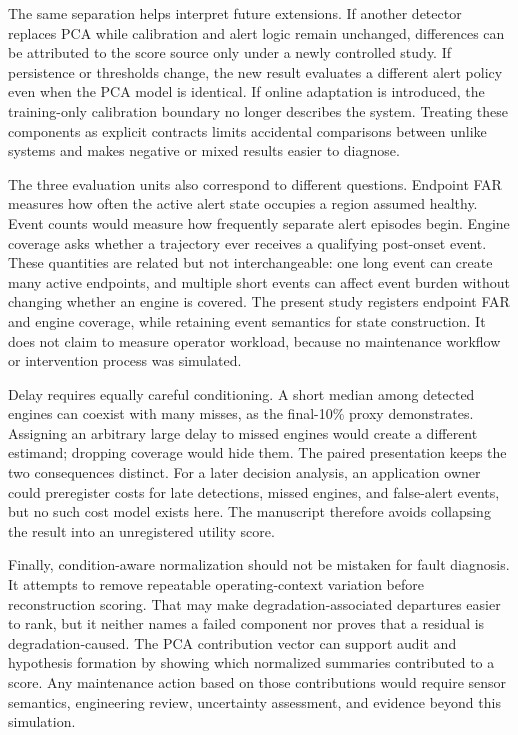 \documentclass[11pt]{article}
\begin{document}
The same separation helps interpret future extensions. If another detector replaces PCA while calibration and alert logic remain unchanged, differences can be attributed to the score source only under a newly controlled study. If persistence or thresholds change, the new result evaluates a different alert policy even when the PCA model is identical. If online adaptation is introduced, the training-only calibration boundary no longer describes the system. Treating these components as explicit contracts limits accidental comparisons between unlike systems and makes negative or mixed results easier to diagnose.


The three evaluation units also correspond to different questions. Endpoint FAR measures how often the active alert state occupies a region assumed healthy. Event counts would measure how frequently separate alert episodes begin. Engine coverage asks whether a trajectory ever receives a qualifying post-onset event. These quantities are related but not interchangeable: one long event can create many active endpoints, and multiple short events can affect event burden without changing whether an engine is covered. The present study registers endpoint FAR and engine coverage, while retaining event semantics for state construction. It does not claim to measure operator workload, because no maintenance workflow or intervention process was simulated.


Delay requires equally careful conditioning. A short median among detected engines can coexist with many misses, as the final-10\% proxy demonstrates. Assigning an arbitrary large delay to missed engines would create a different estimand; dropping coverage would hide them. The paired presentation keeps the two consequences distinct. For a later decision analysis, an application owner could preregister costs for late detections, missed engines, and false-alert events, but no such cost model exists here. The manuscript therefore avoids collapsing the result into an unregistered utility score.


Finally, condition-aware normalization should not be mistaken for fault diagnosis. It attempts to remove repeatable operating-context variation before reconstruction scoring. That may make degradation-associated departures easier to rank, but it neither names a failed component nor proves that a residual is degradation-caused. The PCA contribution vector can support audit and hypothesis formation by showing which normalized summaries contributed to a score. Any maintenance action based on those contributions would require sensor semantics, engineering review, uncertainty assessment, and evidence beyond this simulation.
\end{document}
